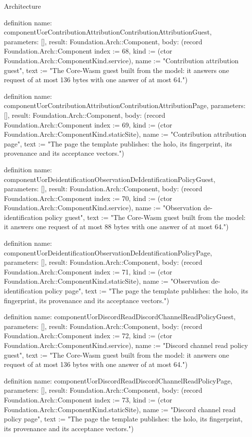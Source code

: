 \begin{lexlean}{Architecture}
\begin{semanticmodule}
definition{
  name: componentUorContributionAttributionContributionAttributionGuest,
  parameters: [],
  result: Foundation.Arch::Component,
  body: (record Foundation.Arch::Component {index := 68, kind := (ctor Foundation.Arch::ComponentKind.service), name := "Contribution attribution guest", text := "The Core-Wasm guest built from the model: it answers one request of at most 136 bytes with one answer of at most 64."})
}

definition{
  name: componentUorContributionAttributionContributionAttributionPage,
  parameters: [],
  result: Foundation.Arch::Component,
  body: (record Foundation.Arch::Component {index := 69, kind := (ctor Foundation.Arch::ComponentKind.staticSite), name := "Contribution attribution page", text := "The page the template publishes: the holo, its fingerprint, its provenance and its acceptance vectors."})
}

definition{
  name: componentUorDeidentificationObservationDeIdentificationPolicyGuest,
  parameters: [],
  result: Foundation.Arch::Component,
  body: (record Foundation.Arch::Component {index := 70, kind := (ctor Foundation.Arch::ComponentKind.service), name := "Observation de-identification policy guest", text := "The Core-Wasm guest built from the model: it answers one request of at most 88 bytes with one answer of at most 64."})
}

definition{
  name: componentUorDeidentificationObservationDeIdentificationPolicyPage,
  parameters: [],
  result: Foundation.Arch::Component,
  body: (record Foundation.Arch::Component {index := 71, kind := (ctor Foundation.Arch::ComponentKind.staticSite), name := "Observation de-identification policy page", text := "The page the template publishes: the holo, its fingerprint, its provenance and its acceptance vectors."})
}

definition{
  name: componentUorDiscordReadDiscordChannelReadPolicyGuest,
  parameters: [],
  result: Foundation.Arch::Component,
  body: (record Foundation.Arch::Component {index := 72, kind := (ctor Foundation.Arch::ComponentKind.service), name := "Discord channel read policy guest", text := "The Core-Wasm guest built from the model: it answers one request of at most 136 bytes with one answer of at most 64."})
}

definition{
  name: componentUorDiscordReadDiscordChannelReadPolicyPage,
  parameters: [],
  result: Foundation.Arch::Component,
  body: (record Foundation.Arch::Component {index := 73, kind := (ctor Foundation.Arch::ComponentKind.staticSite), name := "Discord channel read policy page", text := "The page the template publishes: the holo, its fingerprint, its provenance and its acceptance vectors."})
}


\end{semanticmodule}
\end{lexlean}
